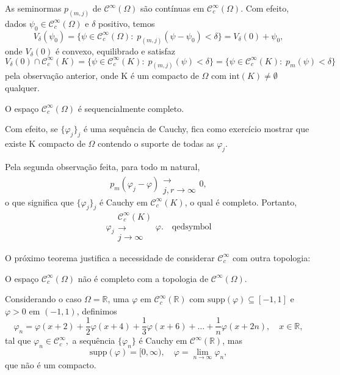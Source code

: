 \documentclass[../distribution_theory_notes.tex]{subfiles}
\begin{document}
\begin{tcolorbox}[
		skin=enhanced,
		title=Observação,
		fonttitle=\bfseries,
		colframe=black,
		colbacktitle=cyan!75!white,
		colback=cyan!15,
		colbacklower=black,
		coltitle=black,
		drop fuzzy shadow,
	]
	As seminormas \(p_{(m, j)}\) de \(\mathcal{C}^{\infty}(\Omega )\) são contínuas em \(\mathcal{C}_{c}^{\infty}(\Omega )\). Com efeito, dados \(\psi_{0}\in \mathcal{C}_{c}^{\infty}(\Omega )\) e \(\delta \) positivo, temos
	\[
		V_{\delta }(\psi_{0})=\{\psi \in \mathcal{C}_{c}^{\infty}(\Omega ):\; p_{(m, j)}(\psi -\psi_{0})<\delta \}=V_{\delta }(0)+\psi_{0},
	\]
	onde \(V_{\delta }(0)\) é convexo, equilibrado e satisfaz
	\[
		V_{\delta }(0)\cap \mathcal{C}_{c}^{\infty}(K)=\{\psi \in \mathcal{C}_{c}^{\infty}(K):\; p_{(m, j)}(\psi )<\delta \}=\{\psi \in \mathcal{C}_{c}^{\infty}(K):\; p_{m}(\psi )<\delta \}
	\]
	pela observação anterior, onde K é um compacto de \(\Omega \) com \(\mathrm{int}(K)\neq\emptyset\) qualquer.
\end{tcolorbox}

\begin{theorem*}
	O espaço \(\mathcal{C}_{c}^{\infty}(\Omega )\) é sequencialmente completo.
\end{theorem*}
\begin{proof*}
	Com efeito, se \(\{\varphi_{j}\}_{j}\) é uma sequência de Cauchy, fica como exercício mostrar que existe K compacto de \(\Omega \) contendo o suporte de todas as \(\varphi_{j}\).

	Pela segunda observação feita, para todo m natural,
	\[
		p_{m}(\varphi_{j}-\varphi )\substack{ \\ \longrightarrow \\ j, r\to \infty}0,
	\]
	o que significa que \(\{\varphi_{j}\}_{j}\) é Cauchy em \(\mathcal{C}_{c}^{\infty}(K)\), o qual é completo. Portanto,
	\[
		\varphi_{j}\substack{\mathcal{C}_{c}^{\infty}(K)\\ \longrightarrow \\ j\to \infty}\varphi. \quad \text{qedsymbol}
	\]
\end{proof*}
O próximo teorema justifica a necessidade de considerar \(\mathcal{C}_{c}^{\infty}\) com outra topologia:
\begin{theorem*}
	O espaço \(\mathcal{C}_{c}^{\infty}(\Omega )\) não é completo com a topologia de \(\mathcal{C}^{\infty}(\Omega )\).
\end{theorem*}
\begin{proof*}
	Considerando o caso \(\Omega = \mathbb{R}\), uma \(\varphi \) em \(\mathcal{C}_{c}^{\infty}(\mathbb{R})\) com \(\mathrm{supp}(\varphi )\subseteq [-1, 1]\) e \( \varphi >0\) em \((-1, 1)\), definimos
	\[
		\varphi_{n}=\varphi (x+2)+\frac{1}{2}\varphi (x+4)+\frac{1}{3}\varphi (x+6)+\dotsc +\frac{1}{n}\varphi (x+2n),\quad x\in \mathbb{R},
	\]
	tal que \(\varphi_{n}\in \mathcal{C}_{c}^{\infty},\) a sequência \(\{\varphi_{n}\}\) é Cauchy em \(\mathcal{C}^{\infty}(\mathbb{R})\), mas
	\[
		\mathrm{supp}(\varphi )=[0, \infty),\quad \varphi = \lim_{n\to \infty}\varphi_{n},
	\]
	que não é um compacto. \qedsymbol
\end{proof*}
\end{document}
